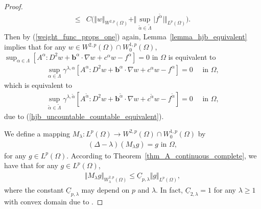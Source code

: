 \documentclass[12pt]{amsart}
\theoremstyle{definition}
\theoremstyle{remark}
\begin{document}
\begin{proof}
\begin{align}
\nonumber
\leq & C \big( \Vert w\Vert_{W^{2,p}(\Omega)} + \Vert \sup_{\tilde{\alpha}
\in \tilde{\Lambda}} \vert f^{\tilde{\alpha}} \vert \Vert_{L^{p}(\Omega)}\big).
\end{align}
Then by (\ref{weight_func_props_one}) again, Lemma~\ref{lemma_hjb_equivalent} implies that 
for any $w \in W^{2,p}(\Omega)\cap W_{0}^{1,p}(\Omega)$, 
$\sup_{\alpha \in \Lambda} [A^{\alpha}:D^{2}w 
+ \boldsymbol{b}^{\alpha}\cdot \nabla w 
+ c^{\alpha}w - f^{\alpha}] = 0$ in $\Omega$ is equivalent to 
\begin{align*}
\sup_{\alpha \in \Lambda} \gamma^{\lambda,\alpha}[A^{\alpha}:D^{2}w 
+ \boldsymbol{b}^{\alpha}\cdot \nabla w 
+ c^{\alpha}w - f^{\alpha}] = 0 \quad \text{ in } \Omega,
\end{align*}
which is equivalent to 
\begin{align}
\label{hjb_pde_equivalent}
\sup_{\tilde{\alpha} \in \tilde{\Lambda}} 
\gamma^{\lambda,\tilde{\alpha}}[A^{\tilde{\alpha}}:D^{2}w 
+ \boldsymbol{b}^{\tilde{\alpha}}\cdot \nabla w 
+ c^{\tilde{\alpha}}w - f^{\tilde{\alpha}}] = 0 \quad \text{ in } \Omega,
\end{align}
due to (\ref{hjb_uncountable_countable_equivalent}).

We define a mapping $M_{\lambda}: L^{p}(\Omega)\rightarrow 
W^{2,p}(\Omega)\cap W_{0}^{1,p}(\Omega)$ by 
\begin{align*}
(\Delta - \lambda )(M_{\lambda} g) = g \text{ in } \Omega,
\end{align*}
for any $g \in L^{p}(\Omega)$.
According to Theorem~\ref{thm_A_continuous_complete}, 
we have that for any $g\in L^{p}(\Omega)$,
\begin{align}
\label{coercivity_poisson_lambda_ineq}
\Vert M_{\lambda}g\Vert_{W_{\lambda}^{2,p}(\Omega)}
 \leq \underline{C}_{p,\lambda} \Vert g\Vert_{L^{p}(\Omega)},
\end{align}
where the constant $\underline{C}_{p,\lambda}$ may depend on $p$ and $\lambda$. 
In fact, $\underline{C}_{2,\lambda} = 1$ for any $\lambda \geq 1$ with convex 
domain due to \cite[Theorem~$2$]{SmearsSuli2014}.


\end{proof}
\end{document}
